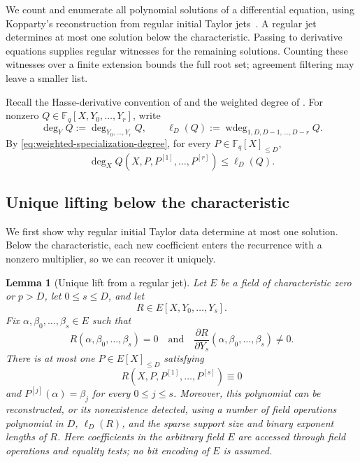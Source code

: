 \documentclass[11pt,letterpaper]{article}
\newtheorem{lemma}[lemma]{Lemma}
\theoremstyle{definition}
\newcommand{\F}{\mathbb{F}}
\newcommand{\wtdeg}{\operatorname{wdeg}}
\begin{document}
We count and enumerate all polynomial solutions of a differential equation,
using Kopparty's reconstruction from regular initial Taylor
jets~\cite[Theorem~4.3, Theorem~4.4, and Corollary~4.5]{Kopparty15}.
A regular jet determines at most one solution below the characteristic.
Passing to derivative equations supplies regular witnesses for the remaining
solutions. Counting these witnesses over a finite extension bounds the full
root set; agreement filtering may leave a smaller list.

Recall the Hasse-derivative convention of
 and the weighted degree of
. For nonzero
\(Q\in\F_q[X,Y_0,\ldots,Y_r]\), write
\[
  \deg_Y Q:=\deg_{Y_0,\ldots,Y_r}Q,
  \qquad
  \ell_D(Q):=\wtdeg_{1,D,D-1,\ldots,D-r}Q.
\]
By \eqref{eq:weighted-specialization-degree}, for every
\(P\in\F_q[X]_{\le D}\),
\begin{equation}
  \deg_X Q(X,P,P^{[1]},\ldots,P^{[r]})\le \ell_D(Q).
  \label{eq:root-specialization-degree}
\end{equation}

\subsection{Unique lifting below the characteristic}

We first show why regular initial Taylor data determine at most one
solution. Below the characteristic, each new coefficient enters the
recurrence with a nonzero multiplier, so we can recover it uniquely.

\begin{lemma}[Unique lift from a regular jet]
\label{lem:unique-regular-lift}
Let \(E\) be a field of characteristic zero or \(p>D\), let \(0\le s\le D\), and let
\[
  R\in E[X,Y_0,\ldots,Y_s].
\]
Fix \(\alpha,\beta_0,\ldots,\beta_s\in E\) such that
\begin{equation}
  R(\alpha,\beta_0,\ldots,\beta_s)=0
  \quad\text{and}\quad
  \frac{\partial R}{\partial Y_s}
  (\alpha,\beta_0,\ldots,\beta_s)\ne0.
  \label{eq:regular-initial-jet}
\end{equation}
There is at most one \(P\in E[X]_{\le D}\) satisfying
\begin{equation}
  R(X,P,P^{[1]},\ldots,P^{[s]})\equiv0
  \label{eq:regular-differential-equation}
\end{equation}
and \(P^{[j]}(\alpha)=\beta_j\) for every \(0\le j\le s\).
Moreover, this polynomial can be reconstructed, or its nonexistence
detected, using a number of field operations polynomial in \(D\),
\(\ell_D(R)\), and the sparse support size and binary exponent lengths of \(R\).
Here coefficients in the arbitrary field $E$ are accessed through field
operations and equality tests; no bit encoding of $E$ is assumed.
\end{lemma}
\end{document}
